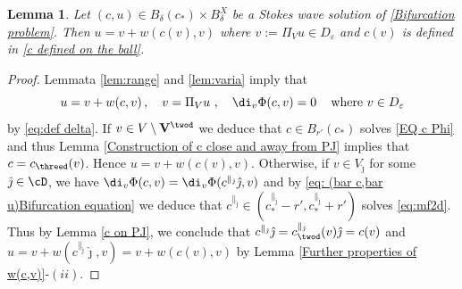\documentclass[11pt,a4paper,reqno]{article}
\numberwithin{equation}{section}
\newtheorem{lemma}[theorem]{Lemma}
\theoremstyle{definition}
\begin{document}
        \begin{lemma}\label{lem:uvw}
        Let  
        $(c, u)\in B_\delta(c_*) \times B_\delta^X $     be 
        a Stokes wave solution of  \eqref{Bifurcation problem}. Then 
$ u= v+w(c( v),  v)$ where 
  $  v:=\Pi_V u\in D_\varepsilon $ and 
$c(v)$ is defined in \eqref{c defined on the ball}.
        \end{lemma}

        \begin{proof}
        Lemmata \ref{lem:range} and \ref{lem:varia}       imply that \begin{equation}\label{eq: (bar c,bar u)Bifurcation equation}
            u= v+w( c,  v)\, , \quad v = \Pi_V u
            \,
            \, , \quad \di_v\Phi( c,  v)=0\, \quad \text{where}
            \ v  
        \in D_\varepsilon 
        \end{equation}
      by \eqref{eq:def delta}.  
        If $ v\in V\setminus{\bf V}^{\twod}$  we deduce that $c\in B_{{r'}}(c_*)$ solves \eqref{EQ c Phi} and thus  Lemma \ref{Construction of c close and away from PJ} implies that  $ c=c_{\threed}( v)$.
        Hence $ u= v+w(c( v),  v)$.
        Otherwise, if $ v\in  V_{\hat \jmath}$ for some 
        $ \hat \jmath \in \cD $, we have $\di_v\Phi (c,v)=\di_v\Phi(c^{\parallel_{\hat \jmath}}\hat \jmath,v)$ and by \eqref{eq: (bar c,bar u)Bifurcation equation} we deduce that  $ c^{\parallel_{\hat \jmath}}\in (c_*^{\parallel_{\hat \jmath}}- {r'}, c_*^{\parallel_{\hat \jmath}}+{r'})$ solves \eqref{eq:mf2d}. Thus by Lemma \ref{c on PJ}, we conclude that  $ c^{\parallel_{\hat \jmath}}\hat \jmath=c^{\parallel_{\hat \jmath}}_{\twod}( v)\hat \jmath =c( v)$ and
       $ u=v+w(c^{\parallel_{\hat \jmath}}\hat \jmath,v)=v+w(c( v), v)$  by 
       Lemma \ref{Further properties of w(c,v)}-$(ii)$. 
\end{proof}
        
\end{document}
